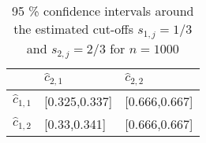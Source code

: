 \begin{table}[ht]
\centering
\begin{tabular}{rll}
  \hline
 & $\hat{c}_{2,1}$ & $\hat{c}_{2,2}$ \\ 
  \hline
$\hat{c}_{1,1}$ & [0.325,0.337] & [0.666,0.667] \\ 
  $\hat{c}_{1,2}$ & [0.33,0.341] & [0.666,0.667] \\ 
   \hline
\end{tabular}
\caption{\label{tab:simulated_precision}95 \% confidence intervals around the estimated cut-offs $s_{1,j} = 1/3$ and $s_{2,j} = 2/3$ for $n=1000$} 
\end{table}
